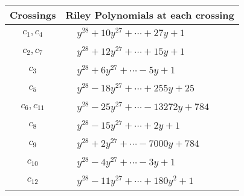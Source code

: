\documentclass[1p]{elsarticle_modified}
\theoremstyle{definition}
\begin{document}
\begin{tabular}{m{50pt}|m{274pt}}
Crossings & \hspace{64pt}Riley Polynomials at each crossing \\
\hline $$\begin{aligned}c_{1},c_{4}\end{aligned}$$&$\begin{aligned}
&y^{28}+10 y^{27}+\cdots+27 y+1
\end{aligned}$\\
\hline $$\begin{aligned}c_{2},c_{7}\end{aligned}$$&$\begin{aligned}
&y^{28}+12 y^{27}+\cdots+15 y+1
\end{aligned}$\\
\hline $$\begin{aligned}c_{3}\end{aligned}$$&$\begin{aligned}
&y^{28}+6 y^{27}+\cdots-5 y+1
\end{aligned}$\\
\hline $$\begin{aligned}c_{5}\end{aligned}$$&$\begin{aligned}
&y^{28}-18 y^{27}+\cdots+255 y+25
\end{aligned}$\\
\hline $$\begin{aligned}c_{6},c_{11}\end{aligned}$$&$\begin{aligned}
&y^{28}-25 y^{27}+\cdots-13272 y+784
\end{aligned}$\\
\hline $$\begin{aligned}c_{8}\end{aligned}$$&$\begin{aligned}
&y^{28}-15 y^{27}+\cdots+2 y+1
\end{aligned}$\\
\hline $$\begin{aligned}c_{9}\end{aligned}$$&$\begin{aligned}
&y^{28}+2 y^{27}+\cdots-7000 y+784
\end{aligned}$\\
\hline $$\begin{aligned}c_{10}\end{aligned}$$&$\begin{aligned}
&y^{28}-4 y^{27}+\cdots-3 y+1
\end{aligned}$\\
\hline $$\begin{aligned}c_{12}\end{aligned}$$&$\begin{aligned}
&y^{28}-11 y^{27}+\cdots+180 y^2+1
\end{aligned}$\\
\hline
\end{tabular}\\~\\
\end{document}
